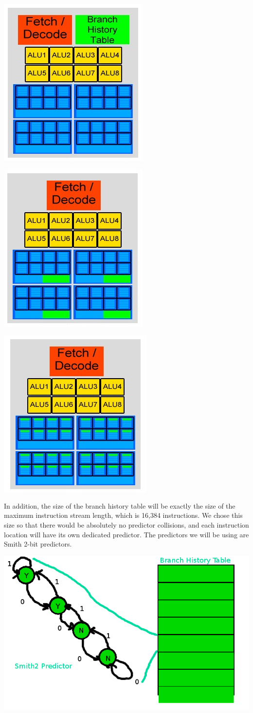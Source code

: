 \documentclass[conference]{IEEEtran}
\begin{document}
\begin{center}
	\includegraphics[width=.2\textwidth]{Our-GPU---per-core-predictor.jpg}
\end{center}

\begin{center}
	\includegraphics[width=.2\textwidth]{Our-GPU---per-context-group-predictor.jpg}
\end{center}

\begin{center}
	\includegraphics[width=.2\textwidth]{Our-GPU---per-element-predictor.jpg}
\end{center}

In addition, the size of the branch history table will be exactly the size of the maximum instruction stream length, which is 16,384 instructions.  We chose this size so that there would be absolutely no predictor collisions, and each instruction location will have its own dedicated predictor.  The predictors we will be using are Smith 2-bit predictors.

\begin{center}
	\includegraphics[width=.45\textwidth]{bht.png}
\end{center}
\end{document}
